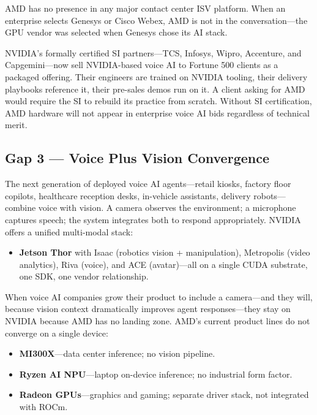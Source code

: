 \documentclass[blind]{gtac}
\begin{document}
AMD has no presence in any major contact center ISV platform. When an enterprise selects Genesys or Cisco Webex, AMD is not in the conversation---the GPU vendor was selected when Genesys chose its AI stack.

NVIDIA's formally certified SI partners---TCS, Infosys, Wipro, Accenture, and Capgemini---now sell NVIDIA-based voice AI to Fortune 500 clients as a packaged offering. Their engineers are trained on NVIDIA tooling, their delivery playbooks reference it, their pre-sales demos run on it. A client asking for AMD would require the SI to rebuild its practice from scratch. Without SI certification, AMD hardware will not appear in enterprise voice AI bids regardless of technical merit.

\subsection{Gap 3 --- Voice Plus Vision Convergence}

The next generation of deployed voice AI agents---retail kiosks, factory floor copilots, healthcare reception desks, in-vehicle assistants, delivery robots---combine voice with vision. A camera observes the environment; a microphone captures speech; the system integrates both to respond appropriately. NVIDIA offers a unified multi-modal stack:

\begin{itemize}
  \item \textbf{Jetson Thor} with Isaac (robotics vision + manipulation), Metropolis (video analytics), Riva (voice), and ACE (avatar)---all on a single CUDA substrate, one SDK, one vendor relationship.
\end{itemize}

When voice AI companies grow their product to include a camera---and they will, because vision context dramatically improves agent responses---they stay on NVIDIA because AMD has no landing zone. AMD's current product lines do not converge on a single device:

\begin{itemize}
  \item \textbf{MI300X}---data center inference; no vision pipeline.
  \item \textbf{Ryzen AI NPU}---laptop on-device inference; no industrial form factor.
  \item \textbf{Radeon GPUs}---graphics and gaming; separate driver stack, not integrated with ROCm.
\end{itemize}
\end{document}
